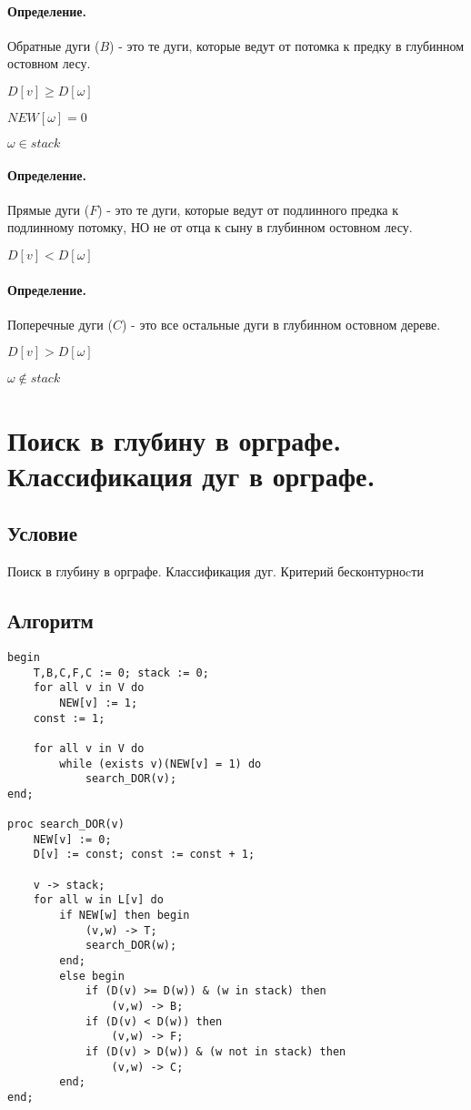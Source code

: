 \documentclass{report}
\begin{document}
 \paragraph*{Определение.}
Обратные дуги ($B$) - это те дуги, которые ведут от потомка к предку в глубинном остовном лесу.

$D[v] \ge  D[\omega]$

$NEW[\omega] = 0$

 $\omega \in stack$

\paragraph*{Определение.}
Прямые дуги ($F$) - это те дуги, которые ведут от подлинного предка к подлинному потомку, НО
не от отца к сыну в глубинном остовном лесу.

$D[v] < D[\omega]$

\paragraph*{Определение.}
Поперечные дуги ($C$) - это все остальные дуги в глубинном остовном дереве.

$D[v] > D[\omega]$

$\omega \notin stack $

\newpage

\section{Поиск в глубину в орграфе. Классификация дуг в орграфе.}
\subsection{Условие}
Поиск в глубину в орграфе. Классификация дуг. Критерий
бесконтурноcти

\subsection{Алгоритм}

\begin{lstlisting}
begin
	T,B,C,F,C := 0; stack := 0;
	for all v in V do
		NEW[v] := 1;
	const := 1;

	for all v in V do
		while (exists v)(NEW[v] = 1) do
			search_DOR(v);
end;

proc search_DOR(v)
	NEW[v] := 0;
	D[v] := const; const := const + 1;

	v -> stack;
	for all w in L[v] do
		if NEW[w] then begin
			(v,w) -> T;
			search_DOR(w);
		end;
		else begin
			if (D(v) >= D(w)) & (w in stack) then
				(v,w) -> B;
			if (D(v) < D(w)) then
				(v,w) -> F;
			if (D(v) > D(w)) & (w not in stack) then
				(v,w) -> C;
		end;
end;
\end{lstlisting}
\end{document}
